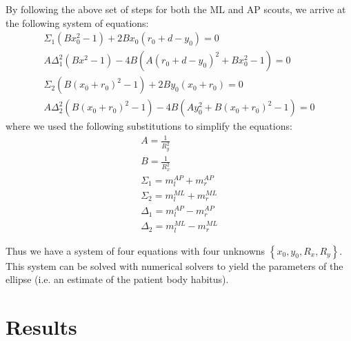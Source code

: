 \documentclass[]{spie}
\begin{document}
By following the above set of steps for both the ML and AP scouts, we arrive at the following system of equations:
\begin{align}
\Sigma_1 \left( B x_0^2 - 1 \right) + 2 B x_0 \left( r_0 + d - y_0 \right) = 0  \nonumber \\
A \Delta_1^2 \left(B x^2 - 1 \right) - 4 B \left(A \left( r_0 + d - y_0 \right) ^2 + B x_0^2 - 1 \right) = 0 \nonumber \\
\Sigma_2 \left( B \left( x_0 + r_0 \right) ^2 - 1 \right) + 2 B y_0 \left( x_0 + r_0 \right) = 0  \nonumber  \\
A \Delta_2^2 \left(B \left( x_0 + r_0 \right) ^2 - 1 \right) - 4 B \left(A y_0^2 + B \left( x_0 + r_0 \right) ^2 - 1 \right) = 0 
\label{eq:finalsysofeqs}
\end{align}
where we used the following substitutions to simplify the equations:
\begin{align}
A = \frac{1}{R_y^2}  \nonumber  \\
B = \frac{1}{R_x^2}  \nonumber  \\
\Sigma_1 = m_l^{AP} + m_r^{AP} \nonumber  \\
\Sigma_2 = m_l^{ML} + m_r^{ML} \nonumber  \\
\Delta_1 = m_l^{AP} - m_r^{AP} \nonumber  \\
\Delta_2 = m_l^{ML} - m_r^{ML}
\end{align}

Thus we have a system of four equations with four unknowns $\left\lbrace x_0, y_0, R_x, R_y \right\rbrace$. This system can be solved with numerical solvers to yield the parameters of the ellipse (i.e. an estimate of the patient body habitus). 

\section{Results}
\label{sec:results}
\end{document}
